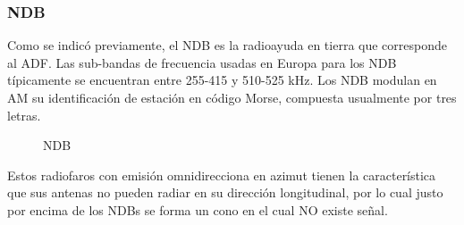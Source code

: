 \subsubsection{NDB}
Como se indic\'o previamente, el NDB es la radioayuda en tierra que corresponde al ADF. Las sub-bandas de frecuencia usadas en Europa para los NDB t\'ipicamente se encuentran entre 255-415 y 510-525 kHz. Los NDB modulan en AM su identificaci\'on de estaci\'on en c\'odigo Morse, compuesta usualmente por tres letras.

\begin{figure}[!htb]
  \centering
	\hspace{6mm}
  \caption{NDB}
\end{figure}


Estos radiofaros con emisi\'on omnidirecciona en azimut tienen la caracter\'istica que sus antenas no pueden radiar en su direcci\'on longitudinal, por lo cual justo por encima de los NDBs se forma un cono en el cual NO existe se\~nal.

